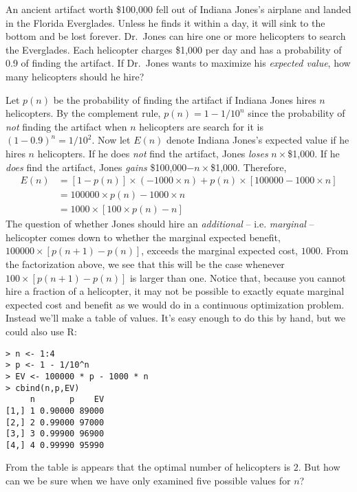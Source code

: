 \documentclass[addpoints,12pt]{exam}
\begin{document}
\begin{questions}
  \question An ancient artifact worth \$100,000 fell out of Indiana Jones's airplane and landed in the Florida Everglades. Unless he finds it within a day, it will sink to the bottom and be lost forever. Dr.\ Jones can hire one or more helicopters to search the Everglades. Each helicopter charges \$1,000 per day and has a probability of 0.9 of finding the artifact. If Dr.\ Jones wants to maximize his \emph{expected value}, how many helicopters should he hire?
  \begin{solution}
    Let $p(n)$ be the probability of finding the artifact if Indiana Jones hires $n$ helicopters.
    By the complement rule, $p(n) = 1 - 1/10^n$ since the probability of \emph{not} finding the artifact when $n$ helicopters are search for it is $(1 - 0.9)^n = 1/10^2$.
    Now let $E(n)$ denote Indiana Jones's expected value if he hires $n$ helicopters.
    If he does \emph{not} find the artifact, Jones \emph{loses} $n \times $\$1,000.
    If he \emph{does} find the artifact, Jones \emph{gains} \$100,000$- n\times $\$1,000.
    Therefore,
    \begin{align*}
      E(n) &= \left[ 1 - p(n) \right] \times \left( -1000 \times n \right) + p(n) \times \left[ 100000 - 1000 \times n \right]\\
      &= 100000 \times p(n) - 1000 \times n\\
      &= 1000 \times \left[ 100 \times p(n) - n \right]
    \end{align*}
    The question of whether Jones should hire an \emph{additional} -- i.e. \emph{marginal} -- helicopter comes down to whether the marginal expected benefit, $100000 \times \left[p(n+1) - p(n)\right]$, exceeds the marginal expected cost, $1000$.
    From the factorization above, we see that this will be the case whenever $100 \times \left[p(n+1) - p(n)\right]$ is larger than one.
    Notice that, because you cannot hire a fraction of a helicopter, it may not be possible to exactly equate marginal expected cost and benefit as we would do in a continuous optimization problem.
    Instead we'll make a table of values. 
    It's easy enough to do this by hand, but we could also use R:
\begin{verbatim}
> n <- 1:4
> p <- 1 - 1/10^n
> EV <- 100000 * p - 1000 * n
> cbind(n,p,EV)
     n       p    EV
[1,] 1 0.90000 89000
[2,] 2 0.99000 97000
[3,] 3 0.99900 96900
[4,] 4 0.99990 95990
\end{verbatim}
From the table is appears that the optimal number of helicopters is $2$.
But how can we be sure when we have only examined five possible values for $n$?

\end{solution}
\end{questions}
\end{document}
